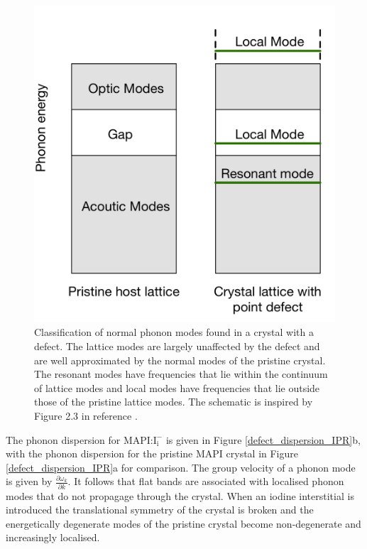 \begin{figure}[h!]   
\centering
  \includegraphics[width=0.4\columnwidth]{figures/ch6/defect_modes_schematic.png}
  \caption[Classification of normal phonon modes found in a crystal with a defect]{Classification of normal phonon modes found in a crystal with a defect. The lattice modes are largely unaffected by the defect and are well approximated by the normal modes of the pristine crystal. The resonant modes have frequencies that lie within the continuum of lattice modes and local modes have frequencies that lie outside those of the pristine lattice modes. The schematic is inspired by Figure 2.3 in reference \cite{Hayes1985}.}
\label{defect_modes_schematic}
\end{figure}  %

The phonon dispersion for MAPI:$\mathrm{I}_\mathrm{i}^-$ is given in Figure \ref{defect_dispersion_IPR}b, with the phonon dispersion for the pristine MAPI crystal in Figure \ref{defect_dispersion_IPR}a for comparison.
The group velocity of a phonon mode is given by $\frac{\partial \omega_k}{\partial k}$. It follows that flat bands are associated with localised phonon modes that do not propagage through the crystal. 
When an iodine interstitial is introduced the translational symmetry of the crystal is broken and the energetically degenerate modes of the pristine crystal become non-degenerate and increasingly localised.

